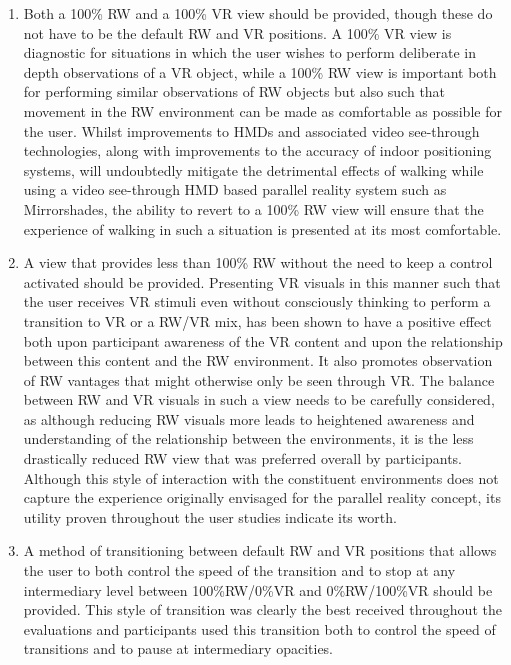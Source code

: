\begin{enumerate}
	\item Both a 100\% RW and a 100\% VR view should be provided, though these do not have to be the default RW and VR positions. A 100\% VR view is diagnostic for situations in which the user wishes to perform deliberate in depth observations of a VR object, while a 100\% RW view is important both for performing similar observations of RW objects but also such that movement in the RW environment can be made as comfortable as possible for the user. Whilst improvements to HMDs and associated video see-through technologies, along with improvements to the accuracy of indoor positioning systems, will undoubtedly mitigate the detrimental effects of walking while using a video see-through HMD based parallel reality system such as Mirrorshades, the ability to revert to a 100\% RW view will ensure that the experience of walking in such a situation is presented at its most comfortable.
	\item A view that provides less than 100\% RW without the need to keep a control activated should be provided. Presenting VR visuals in this manner such that the user receives VR stimuli even without consciously thinking to perform a transition to VR or a RW/VR mix, has been shown to have a positive effect both upon participant awareness of the VR content and upon the relationship between this content and the RW environment. It also promotes observation of RW vantages that might otherwise only be seen through VR. The balance between RW and VR visuals in such a view needs to be carefully considered, as although reducing RW visuals more leads to heightened awareness and understanding of the relationship between the environments, it is the less drastically reduced RW view that was preferred overall by participants. Although this style of interaction with the constituent environments does not capture the experience originally envisaged for the parallel reality concept, its utility proven throughout the user studies indicate its worth.
	\item A method of transitioning between default RW and VR positions that allows the user to both control the speed of the transition and to stop at any intermediary level between 100\%RW/0\%VR and 0\%RW/100\%VR should be provided. This style of transition was clearly the best received throughout the evaluations and participants used this transition both to control the speed of transitions and to pause at intermediary opacities.
	





\end{enumerate}

